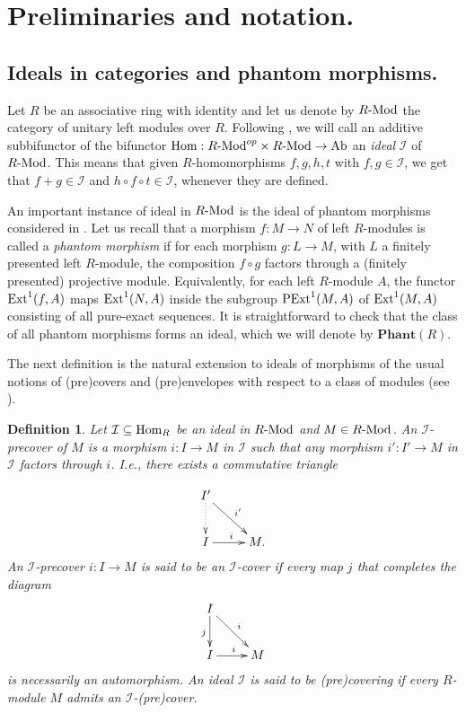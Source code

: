 \documentclass[11pt]{amsart}
\newtheorem{defi}[teor]{Definition}
\begin{document}
{\section{Preliminaries and notation.}

\subsection{Ideals in categories and phantom morphisms.}

Let $R$ be an associative ring with identity and let us denote by $R{\textrm{-}{\rm Mod}}$ the category of unitary left modules over $R$. Following \cite{FGHT}, we will call an additive subbifunctor of the bifunctor ${\mathop{\rm Hom}\nolimits}:R{\textrm{-}{\rm Mod}}^ {op}\times R{\textrm{-}{\rm Mod}}\to \textrm{Ab}$ an \emph{ideal} $\mathcal I$ of $R{\textrm{-}{\rm Mod}}$. This means that given $R$-homomorphisms $f,g,h,t$ with $f,g\in\mathcal I$, we get that $f+g\in \mathcal I$ and $h\circ f\circ t\in \mathcal I$, whenever they are defined.

An important instance of ideal in $R{\textrm{-}{\rm Mod}}$ is the ideal of phantom morphisms considered in \cite{Herzog1}. Let us recall that a morphism $f:M\to N$ of left $R$-modules is called a \emph{phantom morphism} if for each morphism $g:L\to M$, with $L$ a finitely presented left $R$-module, the composition $f\circ g$ factors through a (finitely presented) projective module. Equivalently, for each left $R$-module $A$, the functor ${\mathop{\rm Ext}\nolimits}^1(f,A)$ maps ${\mathop{\rm Ext}\nolimits}^1(N,A)$ inside the subgroup ${\rm PExt}^1(M,A)$ of ${\mathop{\rm Ext}\nolimits}^1(M,A)$ consisting of all pure-exact sequences.
It is straightforward to check that the class of all phantom morphisms forms an ideal, which we will denote by ${\mathbf{Phant}(R)}$. 

The next definition is the natural extension to ideals of morphisms of the usual notions of (pre)covers and (pre)envelopes with respect to a class of modules (see \cite{FGHT}).

\begin{defi}
Let $\mathcal I\subseteq {\mathop{\rm Hom}\nolimits}_R$ be an ideal in $R{\textrm{-}{\rm Mod}}$ and $M\in R{\textrm{-}{\rm Mod}}$. An $\mathcal I$-\emph{precover} of $M$ is a morphism $i:I\to M$ in $\mathcal I$ such that any morphism $i':I'\to M$ in $\mathcal I$ factors through $i$. I.e., there exists a commutative triangle

$$\xymatrix{   I'\ar@{.>}[d]\ar[dr]^{i'}   &  \\
               I\ar[r]^{i}  & M.   }$$
An $\mathcal I$-precover $i:I\to M$ is said to be an $\mathcal I$-cover if every map $j$ that completes the diagram
$$\xymatrix{   I\ar[d]_j\ar[dr]^{i}   &  \\
               I\ar[r]^{i}  & M    }$$
is necessarily an automorphism. An ideal $\mathcal I$ is said to be \emph{(pre)covering} if every $R$-module $M$ admits an $\mathcal I$-(pre)cover. 


\end{defi}}
\end{document}
